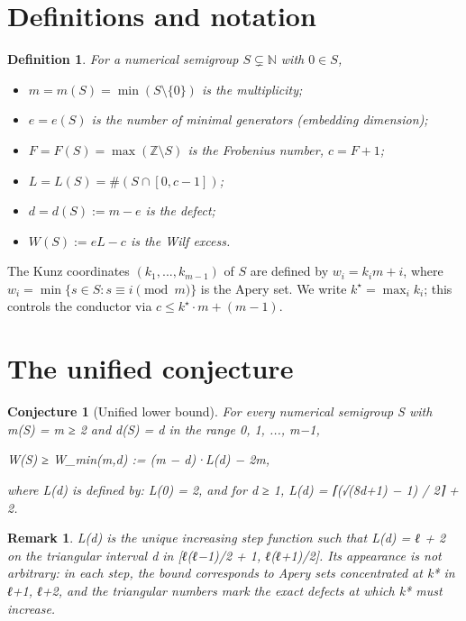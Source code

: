 \documentclass[11pt,a4paper]{article}
\newtheorem{conjecture}[theorem]{Conjecture}
\newtheorem{definition}[theorem]{Definition}
\newtheorem{remark}[theorem]{Remark}
\begin{document}
\section{Definitions and notation}

\begin{definition}
For a numerical semigroup $S \subsetneq \mathbb{N}$ with $0 \in S$,
\begin{itemize}
  \item $m = m(S) = \min (S \setminus \{0\})$ is the \emph{multiplicity};
  \item $e = e(S)$ is the number of minimal generators (\emph{embedding dimension});
  \item $F = F(S) = \max(\mathbb{Z} \setminus S)$ is the \emph{Frobenius number}, $c = F + 1$;
  \item $L = L(S) = \#(S \cap [0,c-1])$;
  \item $d = d(S) := m - e$ is the \emph{defect};
  \item $W(S) := e L - c$ is the \emph{Wilf excess}.
\end{itemize}
\end{definition}

The Kunz coordinates $(k_1,...,k_{m-1})$ of $S$ are defined by
$w_i = k_i m + i$, where $w_i = \min\{s \in S : s \equiv i \pmod{m}\}$
is the Apery set. We write $k^\star = \max_i k_i$; this controls the
conductor via $c \le k^\star \cdot m + (m-1)$.

\section{The unified conjecture}

\begin{conjecture}[Unified lower bound]\label{conj:unified}
For every numerical semigroup S with m(S) = m ≥ 2 and d(S) = d in the
range 0, 1, ..., m−1,

\begin{center}
W(S) ≥ W\_min(m,d) := (m − d)·L(d) − 2m,
\end{center}

where L(d) is defined by: L(0) = 2, and for d ≥ 1,
L(d) = ⌈(√(8d+1) − 1) / 2⌉ + 2.
\end{conjecture}

\begin{remark}
L(d) is the unique increasing step function such that L(d) = ℓ + 2
on the triangular interval d in [ℓ(ℓ−1)/2 + 1, ℓ(ℓ+1)/2].
Its appearance is not arbitrary: in each step, the bound corresponds
to Apery sets concentrated at k* in {ℓ+1, ℓ+2}, and the
triangular numbers mark the exact defects at which k* must
increase.
\end{remark}
\end{document}
